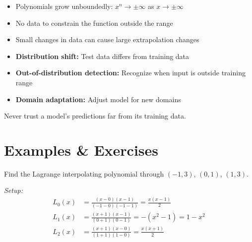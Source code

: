 \begin{itemize}
    \item Polynomials grow unboundedly: $x^n \to \pm\infty$ as $x \to \pm\infty$
    \item No data to constrain the function outside the range
    \item Small changes in data can cause large extrapolation changes
\end{itemize}


\begin{itemize}
    \item \textbf{Distribution shift:} Test data differs from training data
    \item \textbf{Out-of-distribution detection:} Recognize when input is outside training range
    \item \textbf{Domain adaptation:} Adjust model for new domains
\end{itemize}

 Never trust a model's predictions far from its training data.





\newpage
\section{Examples \& Exercises}


 Find the Lagrange interpolating polynomial through $(−1, 3)$, $(0, 1)$, $(1, 3)$.

\textit{Setup:}
\begin{align*}
    L_0(x) &= \frac{(x-0)(x-1)}{(-1-0)(-1-1)} = \frac{x(x-1)}{2} \\
    L_1(x) &= \frac{(x+1)(x-1)}{(0+1)(0-1)} = -(x^2-1) = 1 - x^2 \\
    L_2(x) &= \frac{(x+1)(x-0)}{(1+1)(1-0)} = \frac{x(x+1)}{2}
\end{align*}

